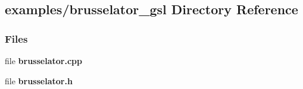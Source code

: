 \subsection{examples/brusselator\+\_\+gsl Directory Reference}
\label{dir_5fb0f6b44578fc5b036c824e221eab9f}
\subsubsection*{Files}
\begin{DoxyCompactItemize}
\item 
file {\bf brusselator.\+cpp}
\item 
file {\bf brusselator.\+h}
\end{DoxyCompactItemize}
